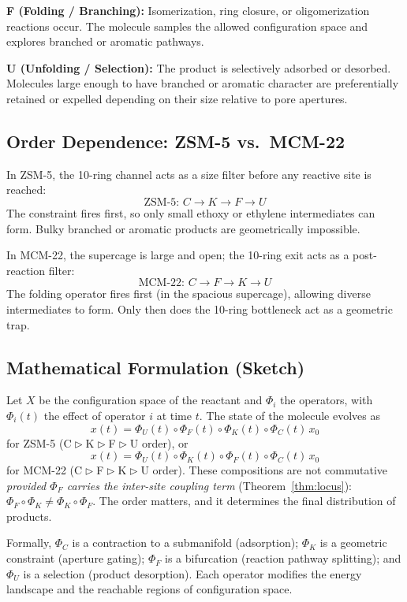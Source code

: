 \documentclass[11pt]{article}
\newcommand{\comp}{\mathrel{\triangleright}} %
\begin{document}
\textbf{F (Folding / Branching):} Isomerization, ring closure, or oligomerization reactions occur. The molecule samples the allowed configuration space and explores branched or aromatic pathways.

\textbf{U (Unfolding / Selection):} The product is selectively adsorbed or desorbed. Molecules large enough to have branched or aromatic character are preferentially retained or expelled depending on their size relative to pore apertures.

\subsection{Order Dependence: ZSM-5 vs.\ MCM-22}

In ZSM-5, the 10-ring channel acts as a size filter before any reactive site is reached:
$$\text{ZSM-5: } C \to K \to F \to U$$
The constraint fires first, so only small ethoxy or ethylene intermediates can form. Bulky branched or aromatic products are geometrically impossible.

In MCM-22, the supercage is large and open; the 10-ring exit acts as a post-reaction filter:
$$\text{MCM-22: } C \to F \to K \to U$$
The folding operator fires first (in the spacious supercage), allowing diverse intermediates to form. Only then does the 10-ring bottleneck act as a geometric trap.

\subsection{Mathematical Formulation (Sketch)}

Let $X$ be the configuration space of the reactant and $\Phi_i$ the operators, with $\Phi_i(t)$ the effect of operator $i$ at time $t$. The state of the molecule evolves as
$$x(t) = \Phi_U(t) \circ \Phi_F(t) \circ \Phi_K(t) \circ \Phi_C(t)\, x_0$$
for ZSM-5 (C$\comp$K$\comp$F$\comp$U order), or
$$x(t) = \Phi_U(t) \circ \Phi_K(t) \circ \Phi_F(t) \circ \Phi_C(t)\, x_0$$
for MCM-22 (C$\comp$F$\comp$K$\comp$U order). These compositions are not commutative \emph{provided $\Phi_F$ carries the inter-site coupling term} (Theorem~\ref{thm:locus}): $\Phi_F \circ \Phi_K \neq \Phi_K \circ \Phi_F$. The order matters, and it determines the final distribution of products.

Formally, $\Phi_C$ is a contraction to a submanifold (adsorption); $\Phi_K$ is a geometric constraint (aperture gating); $\Phi_F$ is a bifurcation (reaction pathway splitting); and $\Phi_U$ is a selection (product desorption). Each operator modifies the energy landscape and the reachable regions of configuration space.
\end{document}

